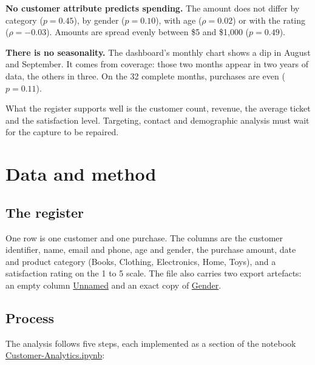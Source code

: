 \documentclass[12pt,a4paper]{article}
\newcommand{\F}[1]{{\small\url{#1}}}
\begin{document}
\textbf{No customer attribute predicts spending.} The amount does not differ by
category ($p = 0.45$), by gender ($p = 0.10$), with age ($\rho = 0.02$) or with the
rating ($\rho = -0.03$). Amounts are spread evenly between \$5 and \$1{,}000
($p = 0.49$).

\textbf{There is no seasonality.} The dashboard's monthly chart shows a dip in August
and September. It comes from coverage: those two months appear in two years of data,
the others in three. On the 32 complete months, purchases are even ($p = 0.11$).

What the register supports well is the customer count, revenue, the average ticket
and the satisfaction level. Targeting, contact and demographic analysis must wait for
the capture to be repaired.

\section{Data and method}

\subsection{The register}

One row is one customer and one purchase. The columns are the customer identifier,
name, email and phone, age and gender, the purchase amount, date and product category
(Books, Clothing, Electronics, Home, Toys), and a satisfaction rating on the 1 to 5
scale. The file also carries two export artefacts: an empty column \F{Unnamed} and an
exact copy of \F{Gender}.

\subsection{Process}

The analysis follows five steps, each implemented as a section of the notebook
\F{Customer-Analytics.ipynb}:
\end{document}
